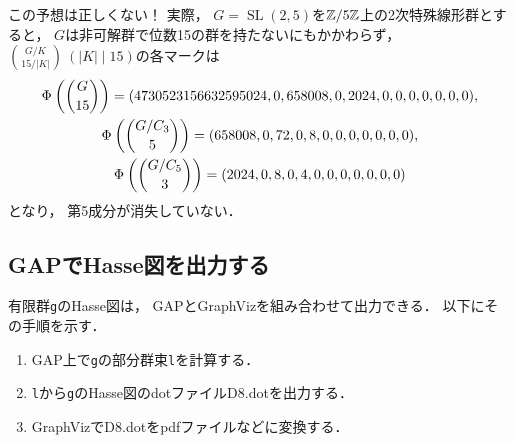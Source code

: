 \documentclass{jlreq}
\newcommand{\Order}[1]{\left| #1 \right|}
\DeclareMathOperator{\SL}{SL}
\begin{document}
	この予想は正しくない！
	実際，
	$G = \SL(2, 5)$を$\mathbb{Z}/5\mathbb{Z}$上の2次特殊線形群とすると，
	$G$は非可解群で位数15の群を持たないにもかかわらず，
	$\binom{G/K}{15/\Order{K}}\ (\Order{K} \mid 15)$の各マークは
	\begin{gather}
		\Phi_{\relax}\left(\binom{G}{15}\right) = (4730523156632595024, 0, 658008, 0, 2024, 0, 0, 0, 0, 0, 0, 0), \\
		\Phi_{\relax}\left(\binom{G/C_3}{5}\right) = (658008, 0, 72, 0, 8, 0, 0, 0, 0, 0, 0, 0), \\
		\Phi_{\relax}\left(\binom{G/C_5}{3}\right) = (2024, 0, 8, 0, 4, 0, 0, 0, 0, 0, 0, 0)
	\end{gather}
	となり，
	第5成分が消失していない．
	
	\subsection{GAPでHasse図を出力する}
	
	有限群\texttt{g}のHasse図は，
	GAPとGraphVizを組み合わせて出力できる．
	以下にその手順を示す．
	
	\begin{enumerate}
		\item GAP上で\texttt{g}の部分群束\texttt{l}を計算する．
		\item \texttt{l}から\texttt{g}のHasse図のdotファイルD8{.}dotを出力する．
		\item GraphVizでD8{.}dotをpdfファイルなどに変換する．
	\end{enumerate}
	
\end{document}
